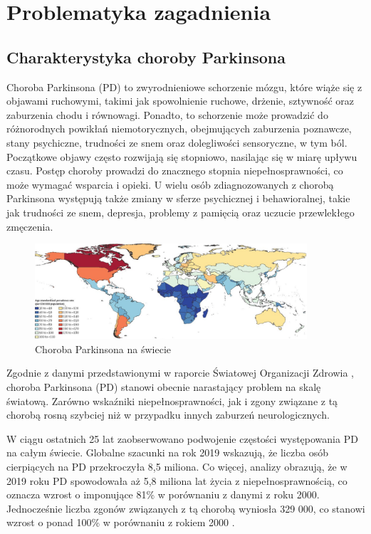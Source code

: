 \chapter{Problematyka zagadnienia}
\label{ch:problematyka}

\section{Charakterystyka choroby Parkinsona}
\label{sec:charakterystykaPD}

Choroba Parkinsona (PD) to zwyrodnieniowe schorzenie mózgu, które wiąże się z objawami ruchowymi, takimi jak spowolnienie ruchowe,
drżenie, sztywność oraz zaburzenia chodu i równowagi.
Ponadto, to schorzenie może prowadzić do różnorodnych powikłań niemotorycznych, obejmujących zaburzenia poznawcze, stany psychiczne,
trudności ze snem oraz dolegliwości sensoryczne, w tym ból.
Początkowe objawy często rozwijają się stopniowo, nasilając się w miarę upływu czasu.
Postęp choroby prowadzi do znacznego stopnia niepełnosprawności, co może wymagać wsparcia i opieki.
U wielu osób zdiagnozowanych z chorobą Parkinsona występują także zmiany w sferze psychicznej i behawioralnej, takie jak
trudności ze snem, depresja, problemy z pamięcią oraz uczucie przewlekłego zmęczenia.

\begin{figure}[htbp]
	\centering
	\includegraphics[width=0.9\textwidth]{./img/map}
	\caption{Choroba Parkinsona na świecie \cite{global_PD}}
    \label{fig:PD_map}
\end{figure}

Zgodnie z danymi przedstawionymi w raporcie Światowej Organizacji Zdrowia \cite{WHO}, choroba Parkinsona (PD) stanowi obecnie narastający problem na skalę światową. Zarówno wskaźniki niepełnosprawności, jak i zgony związane z tą chorobą rosną szybciej niż w przypadku innych zaburzeń neurologicznych.

W ciągu ostatnich 25 lat zaobserwowano podwojenie częstości występowania PD na całym świecie.
Globalne szacunki na rok 2019 wskazują, że liczba osób cierpiących na PD przekroczyła 8,5 miliona.
Co więcej, analizy obrazują, że w 2019 roku PD spowodowała aż 5,8 miliona lat życia z niepełnosprawnością, co oznacza wzrost
o imponujące 81\% w porównaniu z danymi z roku 2000.
Jednocześnie liczba zgonów związanych z tą chorobą wyniosła 329 000, co stanowi wzrost o ponad 100\% w porównaniu z rokiem 2000 \cite{global_PD}.

